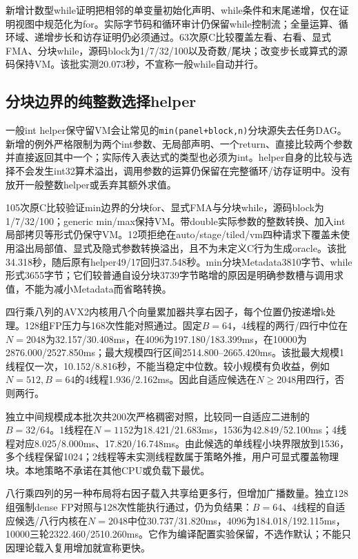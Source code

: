 \documentclass[UTF8,a4paper,11pt]{ctexart}
\begin{document}
新增计数型while证明把相邻的单变量初始化声明、while条件和末尾递增，仅在证明视图中规范化为for。实际字节码和循环审计仍保留while控制流；全量运算、循环域、递增步长和访存证明仍必须通过。63次原C比较覆盖左看、右看、显式FMA、分块while，源码block为1/7/32/100以及奇数/尾块；改变步长或算式的源码保持VM。该批实测20.073秒，不宣称一般while自动并行。

\subsection{分块边界的纯整数选择helper}
一般int helper保守留VM会让常见的\texttt{min(panel+block,n)}分块源失去任务DAG。新增的例外严格限制为两个int参数、无局部声明、一个return、直接比较两个参数并直接返回其中一个；实际传入表达式的类型也必须为int。helper自身的比较与选择不会发生int32算术溢出，调用参数的运算仍保留在完整循环/访存证明中。没有放开一般整数helper或丢弃其额外求值。

105次原C比较验证min边界的分块for、显式FMA与分块while，源码block为1/7/32/100；generic min/max保持VM。带double实际参数的整数转换、加入int局部拷贝等形式仍保守VM。12项拒绝在auto/stage/tiled/vm四种请求下覆盖未使用溢出局部值、显式及隐式参数转换溢出，且不为未定义C行为生成oracle。该批34.318秒，随后原有helper49/17回归37.548秒。min分块Metadata3810字节、while形式3655字节；它们较普通自设分块3739字节略增的原因是明确参数槽与调用求值，不能为减小Metadata而省略转换。

四行乘八列的AVX2内核用八个向量累加器共享右因子，每个位置仍按递增k处理。128组FP压力与168次性能对照通过。固定$B=64$，4线程的两行/四行中位在$N=2048$为32.157/30.408ms，在4096为197.180/183.399ms，在10000为2876.000/2527.850ms；最大规模四行区间2514.800--2665.420ms。该批最大规模1线程仅一次，10.152/8.816秒，不能当稳定中位数。较小规模有负收益，例如$N=512,B=64$的4线程1.936/2.162ms。因此自适应候选在$N\geq2048$用四行，否则两行。

独立中间规模成本批次共200次严格稠密对照，比较同一自适应二进制的$B=32/64$。1线程在$N=1152$为18.421/21.683ms，1536为42.849/52.100ms；4线程对应8.025/8.000ms、17.820/16.748ms。由此候选的单线程小块界限放到1536，多个线程保留1024；2线程等未实测线程数属于策略外推，用户可显式覆盖物理块。本地策略不承诺在其他CPU或负载下最优。

八行乘四列的另一种布局将右因子载入共享给更多行，但增加广播数量。独立128组强制dense FP对照与128次性能执行通过，仍为负结果：$B=64$、4线程的自适应候选/八行内核在$N=2048$中位30.737/31.820ms，4096为184.018/192.115ms，10000三轮2322.460/2510.260ms。它作为编译配置实验保留，不选作默认；不能只因理论载入复用增加就宣称更快。
\end{document}

